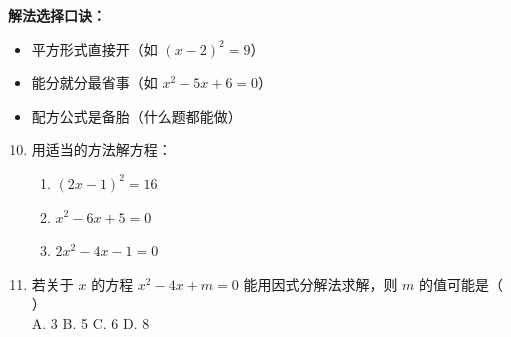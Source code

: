 \documentclass[12pt, a4paper]{article}
\begin{document}
\begin{tipbox}
    \textbf{解法选择口诀：}
    \begin{itemize}
        \item 平方形式直接开（如 $(x-2)^2 = 9$）
        \item 能分就分最省事（如 $x^2 - 5x + 6 = 0$）
        \item 配方公式是备胎（什么题都能做）
    \end{itemize}
\end{tipbox}

\begin{examplebox}
    \begin{enumerate}[label=\textbf{例\arabic*.}]
        \setcounter{enumi}{9}
        \item 用适当的方法解方程：
        \begin{enumerate}
            \item[(1)] $(2x-1)^2 = 16$
            \item[(2)] $x^2 - 6x + 5 = 0$
            \item[(3)] $2x^2 - 4x - 1 = 0$
        \end{enumerate}
        
        \item 若关于 $x$ 的方程 $x^2 - 4x + m = 0$ 能用因式分解法求解，则 $m$ 的值可能是（ \quad ）\\
        A. 3 \quad B. 5 \quad C. 6 \quad D. 8
    \end{enumerate}
\end{examplebox}
\end{document}
